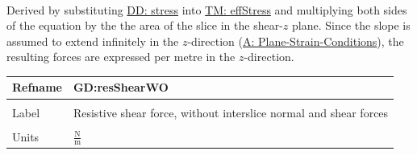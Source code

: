 \documentclass[12pt]{article}
\begin{document}
\paragraph{}
\label{GD:effNormFDeriv}
Derived by substituting \hyperref[DD:stress]{DD: stress} into \hyperref[TM:effStress]{TM: effStress} and multiplying both sides of the equation by the the area of the slice in the shear-$z$ plane. Since the slope is assumed to extend infinitely in the $z$-direction (\hyperref[assumpPSC]{A: Plane-Strain-Conditions}), the resulting forces are expressed per metre in the $z$-direction.

\vspace{\baselineskip}
\noindent
\begin{minipage}{\textwidth}
\begin{tabular}{>{\raggedright}p{}>{\raggedright\arraybackslash}p{}}
\toprule \textbf{Refname} & \textbf{GD:resShearWO}
\label{GD:resShearWO}
\\ \midrule \\
Label & Resistive shear force, without interslice normal and shear forces
        
\\ \midrule \\
Units & $\frac{\text{N}}{\text{m}}$
        

\end{tabular}
\end{minipage}
\end{document}
